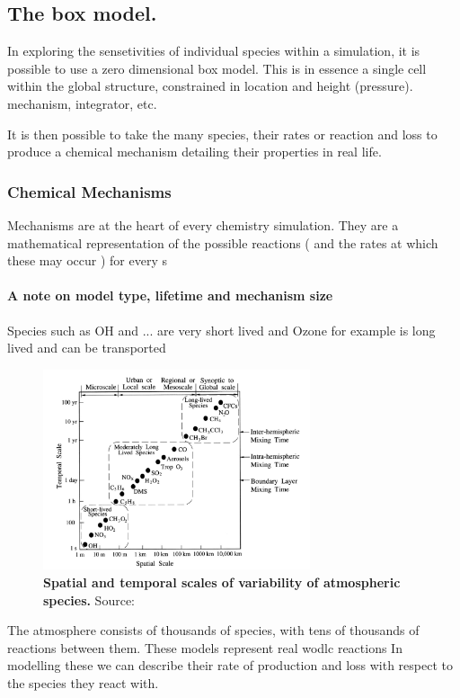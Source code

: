 \subsection{The box model.}
In exploring the sensetivities of individual species within a simulation, it is possible to use a zero dimensional box model. This is in essence a single cell within the global structure, constrained in location and height (pressure).
mechanism,
integrator,
etc.

It is then possible to take the many species, their rates or reaction and loss to produce a chemical mechanism detailing their properties in real life.



\subsubsection{Chemical Mechanisms}
Mechanisms are at the heart of every chemistry simulation. They are a mathematical representation of the possible reactions ( and the rates at which these may occur ) for every s
\paragraph{A note on model type, lifetime and mechanism size}
Species such as OH and ... are very short lived and
Ozone for example is long lived and can be transported


\begin{figure}[H]
  \centering
  \includegraphics[width=0.7\textwidth]{timescales.png}
  \caption{\textbf{Spatial and temporal scales of variability of atmospheric species.} Source: \citep{transporttime}}
  \label{fig:timescales}
\end{figure}

The atmosphere consists of thousands of species, with tens of thousands of reactions between them.
These models represent real wodlc reactions
In modelling these we can describe their rate of production and loss with respect to the species they react with.
